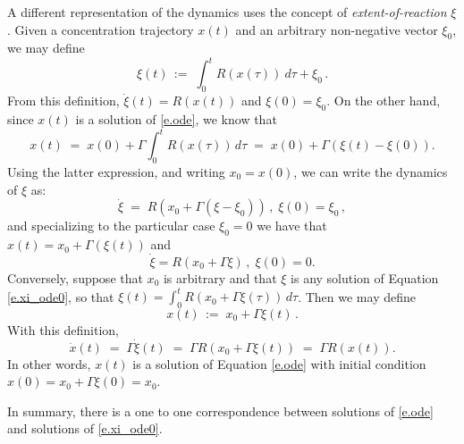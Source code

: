 \documentclass[onefignum,onetabnum]{siamonline220329}
\begin{document}
A different representation of the dynamics uses the concept of \textit{extent-of-reaction} $\xi$ \cite{clarke80}. Given a concentration trajectory $x(t)$ and an arbitrary non-negative vector $\xi_0$, we may define 
\[
\xi(t)\,:=\;\int_0^t R(x(\tau))~d\tau+ \xi_0 \,.
\]
From this definition, $\dot \xi(t)=R(x(t))$ and $\xi(0)=\xi_0$.
On the other hand,
since $x(t)$ is a solution of \eqref{e.ode}, we know that 
\begin{equation}
\label{rel_x_xi} 
x(t)\;=\; x(0) + \Gamma \int_0^t R(x(\tau))\,d\tau \;=\;
x(0) + \Gamma (\xi(t) - \xi(0)). 
\end{equation}  
Using the latter expression, and writing $x_0=x(0)$, we can write the dynamics of $\xi$ as:
\[
\dot \xi \;=\; R(x_0 + \Gamma (\xi-\xi_0) )\,, \;\xi(0)=\xi_0\,,
\]
and specializing to the particular case $\xi_0=0$ we have that
$x(t) = x_0 + \Gamma (\xi(t))$ and
\begin{equation}
\dot \xi = R(x_0 + \Gamma \xi ) \,,\;\xi(0)=0. \label{e.xi_ode0}
\end{equation}
Conversely, suppose that $x_0$ is arbitrary and that $\xi$ is any solution of Equation \eqref{e.xi_ode0}, so that
$\xi(t) = \int_0^t R(x_0 + \Gamma \xi(\tau) )\,d\tau$.
Then we may define
\[
x(t)\,:=\; 
x_0 +  \Gamma \xi(t)\,.
\]
With this definition,
\[
\dot x(t) \;=\; \Gamma \dot\xi(t)
\;=\;
\Gamma R(x_0 + \Gamma \xi({t}) )
\;=\;
\Gamma R(x({t})).
\]
In other words, $x(t)$ is a solution of
Equation \eqref{e.ode}
with initial condition $x(0) = x_0+ \Gamma \xi(0) = x_0$.

In summary, there is a one to one correspondence between solutions of \eqref{e.ode} and solutions of \eqref{e.xi_ode0}. 
 
\end{document}
